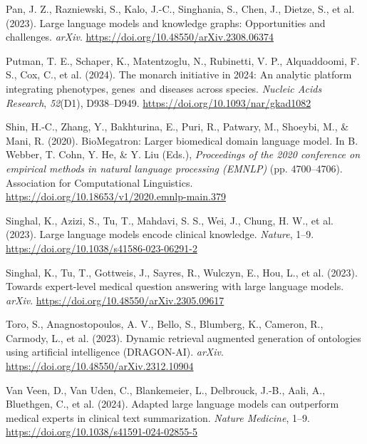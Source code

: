\documentclass[
]{agujournal2019}
\newlength{\cslhangindent}
\newenvironment{CSLReferences}[2] %
 {\begin{list}{}{%
  \setlength{\itemindent}{0pt}
  \setlength{\leftmargin}{0pt}
  \setlength{\parsep}{0pt}
  \ifodd #1
   \setlength{\leftmargin}{\cslhangindent}
   \setlength{\itemindent}{-1\cslhangindent}
  \fi
  \setlength{\itemsep}{#2\baselineskip}}}
 {\end{list}}
\begin{document}
\begin{CSLReferences}{1}{0}
Pan, J. Z., Razniewski, S., Kalo, J.-C., Singhania, S., Chen, J.,
Dietze, S., et al. (2023). Large language models and knowledge graphs:
Opportunities and challenges. \emph{arXiv}.
\url{https://doi.org/10.48550/arXiv.2308.06374}

Putman, T. E., Schaper, K., Matentzoglu, N., Rubinetti, V. P.,
Alquaddoomi, F. S., Cox, C., et al. (2024). The monarch initiative in
2024: An analytic platform integrating phenotypes, genes~and diseases
across species. \emph{Nucleic Acids Research}, \emph{52}(D1),
D938--D949. \url{https://doi.org/10.1093/nar/gkad1082}

Shin, H.-C., Zhang, Y., Bakhturina, E., Puri, R., Patwary, M., Shoeybi,
M., \& Mani, R. (2020). BioMegatron: Larger biomedical domain language
model. In B. Webber, T. Cohn, Y. He, \& Y. Liu (Eds.), \emph{Proceedings
of the 2020 conference on empirical methods in natural language
processing (EMNLP)} (pp. 4700--4706). Association for Computational
Linguistics. \url{https://doi.org/10.18653/v1/2020.emnlp-main.379}

Singhal, K., Azizi, S., Tu, T., Mahdavi, S. S., Wei, J., Chung, H. W.,
et al. (2023). Large language models encode clinical knowledge.
\emph{Nature}, 1--9. \url{https://doi.org/10.1038/s41586-023-06291-2}

Singhal, K., Tu, T., Gottweis, J., Sayres, R., Wulczyn, E., Hou, L., et
al. (2023). Towards expert-level medical question answering with large
language models. \emph{arXiv}.
\url{https://doi.org/10.48550/arXiv.2305.09617}

Toro, S., Anagnostopoulos, A. V., Bello, S., Blumberg, K., Cameron, R.,
Carmody, L., et al. (2023). Dynamic retrieval augmented generation of
ontologies using artificial intelligence (DRAGON-AI). \emph{arXiv}.
\url{https://doi.org/10.48550/arXiv.2312.10904}

Van Veen, D., Van Uden, C., Blankemeier, L., Delbrouck, J.-B., Aali, A.,
Bluethgen, C., et al. (2024). Adapted large language models can
outperform medical experts in clinical text summarization. \emph{Nature
Medicine}, 1--9. \url{https://doi.org/10.1038/s41591-024-02855-5}


\end{CSLReferences}
\end{document}
